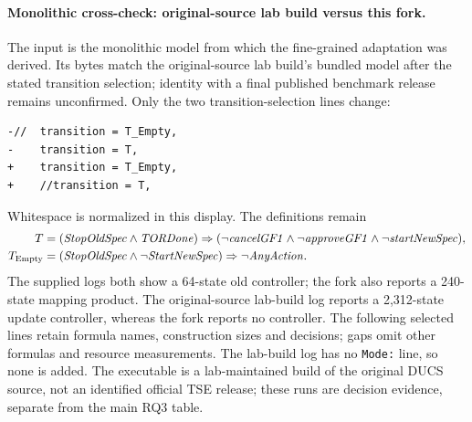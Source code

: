 \documentclass[11pt]{article}
\begin{document}
\paragraph{Monolithic cross-check: original-source lab build versus this fork.}
The input is the monolithic model from which the fine-grained adaptation was derived. Its bytes match the original-source lab build's bundled model after the stated transition selection; identity with a final published benchmark release remains unconfirmed. Only the two transition-selection lines change:
{\small\begin{verbatim}
-//  transition = T_Empty,
-    transition = T,
+    transition = T_Empty,
+    //transition = T,
\end{verbatim}}
Whitespace is normalized in this display. The definitions remain
\[
\begin{aligned}
T&=(\mathit{StopOldSpec}\land\mathit{TORDone})\Rightarrow
 (\neg\mathit{cancelGF1}\land\neg\mathit{approveGF1}
 \land\neg\mathit{startNewSpec}),\\
T_{\rm Empty}&=(\mathit{StopOldSpec}\land\neg\mathit{StartNewSpec})
 \Rightarrow\neg\mathit{AnyAction}.
\end{aligned}
\]
The supplied logs both show a 64-state old controller; the fork also reports a 240-state mapping product. The original-source lab-build log reports a 2,312-state update controller, whereas the fork reports no controller. The following selected lines retain formula names, construction sizes and decisions; gaps omit other formulas and resource measurements. The lab-build log has no \texttt{Mode:} line, so none is added. The executable is a lab-maintained build of the original DUCS source, not an identified official TSE release; these runs are decision evidence, separate from the main RQ3 table.
\end{document}
